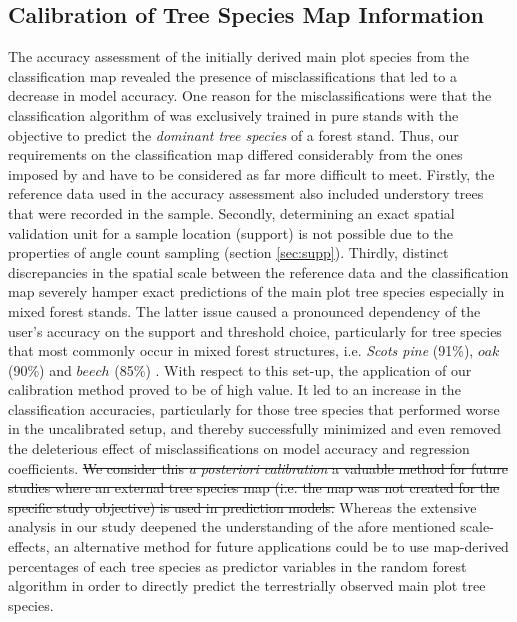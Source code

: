 \subsection{Calibration of Tree Species Map Information}
\label{sec:calib_dis}
The accuracy assessment of the initially derived main plot species from the classification map revealed the presence of misclassifications that led to a decrease in model accuracy.  One reason for the misclassifications were that the classification algorithm of \citet{stoffels2015} was exclusively trained in pure stands with the objective to predict the \textit{dominant tree species} of a forest stand. Thus, our requirements on the classification map differed considerably from the ones imposed by \citet{stoffels2015} and have to be considered as far more difficult to meet. Firstly, the reference data used in the accuracy assessment also included understory trees that were recorded in the \bwi{} sample. Secondly, determining an exact spatial validation unit for a sample location (support) is not possible due to the properties of angle count sampling (section \ref{sec:supp}). Thirdly, distinct discrepancies in the spatial scale between the reference data and the classification map severely hamper exact predictions of the main plot tree species especially in mixed forest stands. The latter issue caused a pronounced dependency of the user's accuracy on the support and threshold choice, particularly for tree species that most commonly occur in mixed forest structures, i.e. \textit{Scots pine} (91\%), $oak$ (90\%) and $beech$ (85\%) \citep{bwi3}. With respect to this set-up, the application of our calibration method proved to be of high value. It led to an increase in the classification accuracies, particularly for those tree species that performed worse in the uncalibrated setup, and thereby successfully minimized and even removed the deleterious effect of misclassifications on model accuracy and regression coefficients. \sout{We consider this \textit{a posteriori calibration} a valuable method for future studies where an external tree species map (i.e. the map was not created for the specific study objective) is used in prediction models.} Whereas the extensive analysis in our study deepened the understanding of the afore mentioned scale-effects, an alternative method for future applications could be to use map-derived percentages of each tree species as predictor variables in the random forest algorithm in order to directly predict the terrestrially observed main plot tree species.

